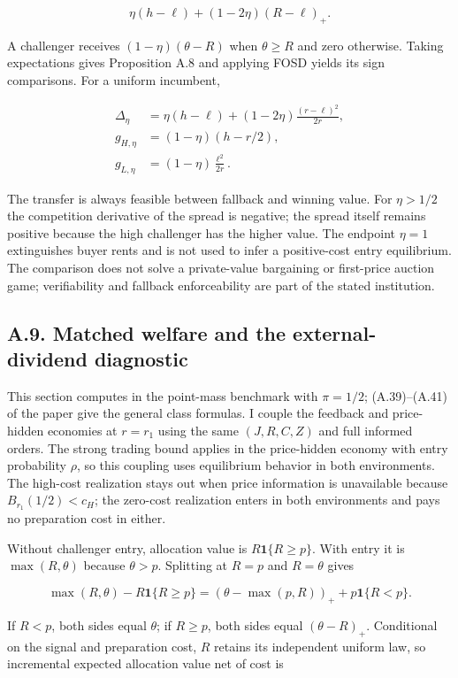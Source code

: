 \documentclass[
  11pt,
]{article}
\begin{document}
\[
\eta(h-\ell)+(1-2\eta)(R-\ell)_+.
\tag{OA.43}\label{eq:oa-oa-43}
\]

A challenger receives \((1-\eta)(\theta-R)\) when \(\theta\ge R\) and
zero otherwise. Taking expectations gives Proposition A.8 and applying
FOSD yields its sign comparisons. For a uniform incumbent,

\[
\begin{aligned}
\Delta_\eta&=\eta(h-\ell)+(1-2\eta)\frac{(r-\ell)^2}{2r},\\
g_{H,\eta}&=(1-\eta)(h-r/2),\\
g_{L,\eta}&=(1-\eta)\frac{\ell^2}{2r}.
\end{aligned}
\tag{OA.44}\label{eq:oa-oa-44}
\]

The transfer is always feasible between fallback and winning value. For
\(\eta>1/2\) the competition derivative of the spread is negative; the
spread itself remains positive because the high challenger has the
higher value. The endpoint \(\eta=1\) extinguishes buyer rents and is
not used to infer a positive-cost entry equilibrium. The comparison does
not solve a private-value bargaining or first-price auction game;
verifiability and fallback enforceability are part of the stated
institution.

\subsection{A.9. Matched welfare and the external-dividend
diagnostic}\label{oa-a-welfare}

This section computes in the point-mass benchmark with \(\pi=1/2\);
(A.39)--(A.41) of the paper give the general class formulas. I couple
the feedback and price-hidden economies at \(r=r_1\) using the same
\((J,R,C,Z)\) and full informed orders. The strong trading
bound applies in the price-hidden economy with entry probability
\(\rho\), so this coupling uses equilibrium behavior in both
environments. The high-cost realization stays out when price information
is unavailable because \(B_{r_1}(1/2)<c_H\); the zero-cost realization
enters in both environments and pays no preparation cost in either.

Without challenger entry, allocation value is \(R\mathbf1\{R\ge p\}\).
With entry it is \(\max(R,\theta)\) because \(\theta>p\). Splitting at
\(R=p\) and \(R=\theta\) gives

\[
\max(R,\theta)-R\mathbf1\{R\ge p\}
=(\theta-\max(p,R))_++p\mathbf1\{R<p\}.
\tag{OA.45}\label{eq:oa-oa-45}
\]

If \(R<p\), both sides equal \(\theta\); if \(R\ge p\), both sides equal
\((\theta-R)_+\). Conditional on the signal and preparation cost, \(R\)
retains its independent uniform law, so incremental expected allocation
value net of cost is
\end{document}
